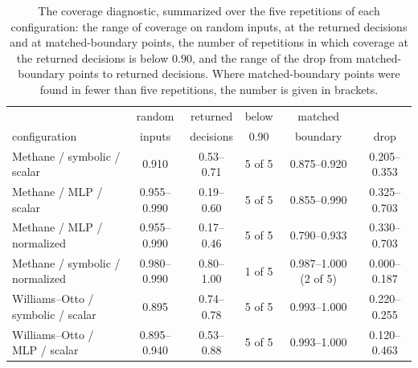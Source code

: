 \begin{table}[t]
\centering
\footnotesize
\setlength{\tabcolsep}{4pt}
\caption{The coverage diagnostic, summarized over the five repetitions of each
configuration: the range of coverage on random inputs, at the returned decisions
and at matched-boundary points, the number of repetitions in which coverage at the
returned decisions is below $0.90$, and the range of the drop from matched-boundary
points to returned decisions. Where matched-boundary points were found in fewer
than five repetitions, the number is given in brackets.}
\label{tab:fcs-fits}
\begin{tabular}{lccccc}
\toprule
 & random & returned & below & matched & \\
configuration & inputs & decisions & $0.90$ & boundary & drop \\
\midrule
Methane / symbolic / scalar & 0.910 & 0.53--0.71 & 5 of 5 & 0.875--0.920 & 0.205--0.353 \\
Methane / MLP / scalar & 0.955--0.990 & 0.19--0.60 & 5 of 5 & 0.855--0.990 & 0.325--0.703 \\
Methane / MLP / normalized & 0.955--0.990 & 0.17--0.46 & 5 of 5 & 0.790--0.933 & 0.330--0.703 \\
Methane / symbolic / normalized & 0.980--0.990 & 0.80--1.00 & 1 of 5 & 0.987--1.000 (2 of 5) & 0.000--0.187 \\
Williams--Otto / symbolic / scalar & 0.895 & 0.74--0.78 & 5 of 5 & 0.993--1.000 & 0.220--0.255 \\
Williams--Otto / MLP / scalar & 0.895--0.940 & 0.53--0.88 & 5 of 5 & 0.993--1.000 & 0.120--0.463 \\
\bottomrule
\end{tabular}
\end{table}
